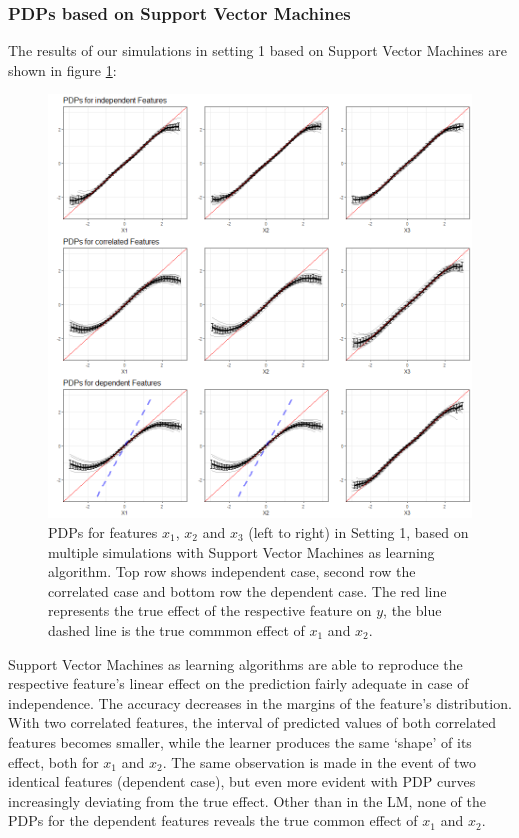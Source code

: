 \documentclass[
]{krantz}
\begin{document}
\hypertarget{pdps-based-on-support-vector-machines}{%
\subsubsection{PDPs based on Support Vector Machines}\label{pdps-based-on-support-vector-machines}}

The results of our simulations in setting 1 based on Support Vector Machines are shown in figure \ref{fig:Figure16}:

\begin{figure}

\includegraphics[width=1\linewidth]{images/VK_PDP_16_Set1_SVM} \hfill{}

\caption{PDPs for features $x_1$, $x_2$ and $x_3$ (left to right) in Setting 1, based on multiple simulations with Support Vector Machines as learning algorithm. Top row shows independent case, second row the correlated case and bottom row the dependent case. The red line represents the true effect of the respective feature on $y$, the blue dashed line is the true commmon effect of $x_1$ and $x_2$.}\label{fig:Figure16}
\end{figure}

Support Vector Machines as learning algorithms are able to reproduce the respective feature's linear effect on the prediction fairly adequate in case of independence. The accuracy decreases in the margins of the feature's distribution. With two correlated features, the interval of predicted values of both correlated features becomes smaller, while the learner produces the same `shape' of its effect, both for \(x_1\) and \(x_2\). The same observation is made in the event of two identical features (dependent case), but even more evident with PDP curves increasingly deviating from the true effect. Other than in the LM, none of the PDPs for the dependent features reveals the true common effect of \(x_1\) and \(x_2\).
\end{document}
